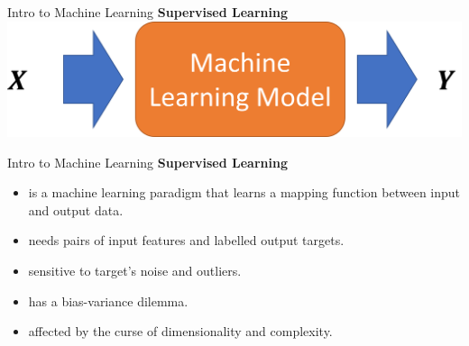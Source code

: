 \documentclass{beamer}
\begin{document}
\begin{frame}[fragile]{Intro to Machine Learning}
    \textbf{Supervised Learning}
    \includegraphics[width=\textwidth,height=\textheight,keepaspectratio]{figures/Supervised.png}
\end{frame}
\begin{frame}[fragile]{Intro to Machine Learning}
    \textbf{Supervised Learning}
    \begin{itemize}
        \item is a machine learning paradigm that learns a mapping function between input and output data.
        \item needs pairs of input features and labelled output targets.
        \pause
        \item sensitive to target's noise and outliers.
        \item has a bias-variance dilemma.
        \item affected by the curse of dimensionality and complexity.
    \end{itemize}
\end{frame}
\end{document}
